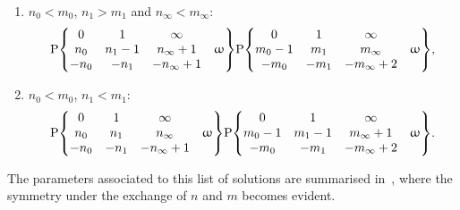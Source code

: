 \begin{enumerate}
   \item $n_{0} < m_{0}$, $n_{1} > m_{1}$ and $n_{\infty} < m_{\infty}$:
     \begin{equation}
       \rP\qty{
         \mqty{
           0
           &
           1
           &
           \infty
           &
           \\
           n_{0}
           &
           n_{1} - 1
           &
           n_{\infty} + 1
           &
           \omega
           \\
           -n_{0}
           &
           -n_{1}
           &
           -n_{\infty} + 1
           &
         }
       }
       \rP\qty{
         \mqty{
           0
           &
           1
           &
           \infty
           &
           \\
           m_{0} - 1
           &
           m_{1}
           &
           m_{\infty}
           &
           \omega
           \\
           -m_{0}
           &
           -m_{1}
           &
           -m_{\infty} + 2
           &
         }
       },
       \label{eq:X_solution<><}
     \end{equation}

   \item $n_{0} < m_{0}$, $n_{1} < m_{1}$:
     \begin{equation}
       \rP\qty{
         \mqty{
           0
           &
           1
           &
           \infty
           &
           \\
           n_{0}
           &
           n_{1}
           &
           n_{\infty}
           &
           \omega
           \\
           -n_{0}
           &
           -n_{1}
           &
           -n_{\infty} + 1
           &
         }
       }
       \rP\qty{
         \mqty{
           0
           &
           1
           &
           \infty
           &
           \\
           m_{0} - 1
           &
           m_{1} - 1
           &
           m_{\infty} + 1
           &
           \omega
           \\
           -m_{0}
           &
           -m_{1}
           &
           -m_{\infty} + 2
           &
         }
       }.
       \label{eq:X_solution<<}
     \end{equation}
\end{enumerate}
The parameters associated to this list of solutions are summarised in~, where the symmetry under the exchange of $n$ and $m$ becomes evident.

